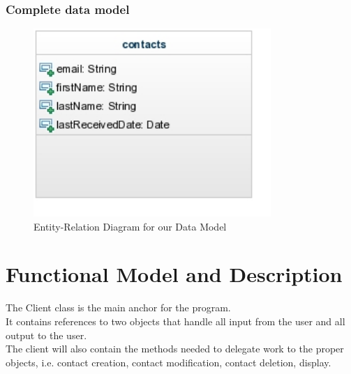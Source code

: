 \documentclass{article}
\begin{document}
\subsubsection{Complete data model}
\begin{figure}[H]
\centering
\includegraphics[width=90mm]{img/db_erd.jpg}
\caption{Entity-Relation Diagram for our Data Model \label{db_erd}}
\end{figure}


\section{Functional Model and Description}
The Client class is the main anchor for the program. \\
It contains references to two objects that handle all input from the user and all output to the user. \\
The client will also contain the methods needed to delegate work to the proper objects, i.e. contact creation, contact modification, contact deletion, display. \\
\end{document}
